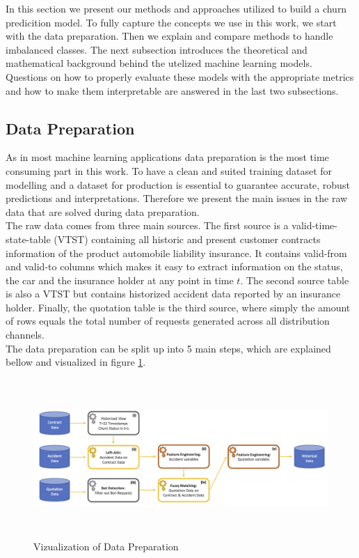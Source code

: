 \documentclass[12pt,titlepage]{article}
\begin{document}
In this section we present our methods and approaches utilized to build a churn predicition model. To fully capture the concepts we use in this work, we start with the data preparation. Then we explain and compare methods to handle imbalanced classes. The next subsection introduces the theoretical and mathematical background behind the utelized machine learning models. Questions on how to properly evaluate these models with the appropriate metrics and how to make them interpretable are answered in the last two subsections. \\

\subsection{Data Preparation} \par
\label{chap:dataprep}

As in most machine learning applications data preparation is the most time consuming part in this work. To have a clean and suited training dataset for modelling and a dataset for production is essential to guarantee accurate, robust predictions and interpretations. Therefore we present the main issues in the raw data that are solved during data preparation. \\
The raw data comes from three main sources. The first source is a valid-time-state-table (VTST) containing all historic and present customer contracts information of the product automobile liability insurance. It contains valid-from and valid-to columns which makes it easy to extract information on the status, the car and the insurance holder at any point in time $t$. The second source table is also a VTST but contains historized accident data reported by an insurance holder. Finally, the quotation table is the third source, where simply the amount of rows equals the total number of requests generated across all distribution channels. \\
The data preparation can be split up into 5 main steps, which are explained bellow and visualized in figure \ref{fig:preparation}. \\
\begin{figure}[H]
    \centerline{\includegraphics[height=6cm]{data_preparation.png}}
\caption{Vizualization of Data Preparation}
\label{fig:preparation}
\end{figure}
\end{document}
